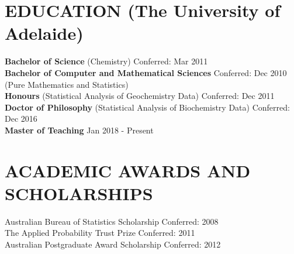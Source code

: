 \documentclass{res}
\begin{document}
 


\address{\bf DETAILS \\ 
		mobile: (+61) 431 955 152 \\
		email: \href{mailto:armadilloa16@gmail.com}{armadilloa16@gmail.com} \\
		eportfolio: \href{https://armadilloa16.github.io/eportfolio/}{armadilloa16.github.io/eportfolio}
}
\address{\bf ADDRESS \\
		3 Hallett Avenue \\  
		Tranmere
		SA 5073 \\
		Australia}
                                  
\begin{resume}

\section{EDUCATION (The University of Adelaide)} 
{\bf Bachelor of Science } (Chemistry) \hfill Conferred: Mar 2011 \\
{\bf Bachelor of Computer and Mathematical Sciences } \hfill Conferred: Dec 2010 \\ 
(Pure Mathematics and Statistics) \\ %
{\bf Honours } (Statistical Analysis of Geochemistry Data) \hfill Conferred: Dec 2011  \\
{\bf Doctor of Philosophy } (Statistical Analysis of Biochemistry Data) \hfill Conferred: Dec 2016  \\ %
{\bf Master of Teaching} \hfill Jan 2018 - Present  \\ \vspace{-0.5cm}


\section{ACADEMIC AWARDS AND SCHOLARSHIPS}
Australian Bureau of Statistics Scholarship \hfill Conferred: 2008 \\
The Applied Probability Trust Prize \hfill Conferred: 2011 \\
Australian Postgraduate Award Scholarship \hfill Conferred: 2012 \\ \vspace{-0.5cm}


\end{resume}
\end{document}
